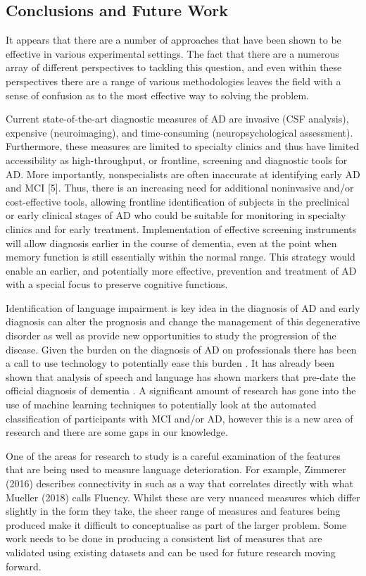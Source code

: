 \documentclass[12pt, twoside, a4paper]{article}
\begin{document}
\subsection{Conclusions and Future Work}
It appears that there are a number of approaches that have been shown to be effective in various experimental settings. The fact that there are a numerous array of different perspectives to tackling this question, and even within these perspectives there are a range of various methodologies leaves the field with a sense of confusion as to the most effective way to solving the problem.
\par
Current state-of-the-art diagnostic measures of AD are invasive (CSF analysis), expensive (neuroimaging), and time-consuming (neuropsychological assessment). Furthermore, these measures are limited to specialty clinics and thus have limited accessibility as high-throughput, or frontline, screening and diagnostic tools for AD. More importantly, nonspecialists are often inaccurate at identifying early AD and MCI [5]. Thus, there is an increasing need for additional noninvasive and/or cost-effective tools, allowing frontline identification of subjects in the preclinical or early clinical stages of AD who could be suitable for monitoring in specialty clinics and for early treatment. Implementation of effective screening instruments will allow diagnosis earlier in the course of dementia, even at the point when memory function is still essentially within the normal range. This strategy would enable an earlier, and potentially more effective, prevention and treatment of AD with a special focus to preserve cognitive functions.
\par
Identification of language impairment is key idea in the diagnosis of AD and early diagnosis can alter the prognosis and change the management of this degenerative disorder as well as provide new opportunities to study the progression of the disease. Given the burden on the diagnosis of AD on professionals there has been a call to use technology to potentially ease this burden \cite{Boschi2017}. It has already been shown that analysis of speech and language has shown markers that pre-date the official diagnosis of dementia \cite{Snowdon1996, Berisha2015}. A significant amount of research has gone into the use of machine learning techniques to potentially look at the automated classification of participants with MCI and/or AD, however this is a new area of research and there are some gaps in our knowledge.
\par
One of the areas for research to study is a careful examination of the features that are being used to measure language deterioration. For example, Zimmerer (2016) \cite{Zimmerer2016} describes connectivity in such as a way that correlates directly with what Mueller (2018) \cite{Mueller2018a} calls Fluency. Whilst these are very nuanced measures which differ slightly in the form they take, the sheer range of measures and features being produced make it difficult to conceptualise as part of the larger problem. Some work needs to be done in producing a consistent list of measures that are validated using existing datasets and can be used for future research moving forward. \newline
\par
\end{document}

